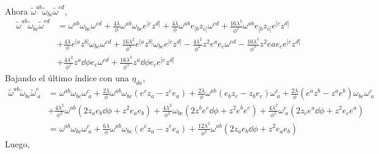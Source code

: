 Ahora $\tilde{\omega}^{ab}\tilde{\omega}_{bc}\tilde{\omega}^{cd}$,
\begin{align}
  \tilde{\omega}^{ab}\tilde{\omega}_{bc}\tilde{\omega}^{cd}&=\omega^{ab}\omega_{bc}\omega^{cd}+\frac{4\lambda}{\phi}\omega^{ab}\omega_{bc}e^{[c}z^{d]}+\frac{4\lambda}{\phi}\omega^{ab}e_{[b}z_{c]}\omega^{cd}+\frac{16\lambda^2}{\phi^2}\omega^{ab}e_{[b}z_{c]}e^{[c}z^{d]}\\&+\frac{4\lambda}{\phi}e^{[a}z^{b]}\omega_{bc}\omega^{cd}+\frac{16\lambda^2}{\phi^2}e^{[a}z^{b]}\omega_{bc}e^{[c}z^{d]}-\frac{4\lambda^2}{\phi^2}z^2e^{a}e_c\omega^{cd}-\frac{16\lambda^3}{\phi^3}z^2e{a}e_ce^{[c}z^{d]}\\
  &+\frac{4\lambda^2}{\phi^2}z^{a}\dd\phi e_c\omega^{cd}+\frac{16\lambda^3}{\phi^3}z^{a}\dd\phi e_ce^{[c}z^{d]}
\end{align}
Bajando el último índice con una $\eta_{da}$,
\begin{align*}
  \tilde{\omega}^{ab}\tilde{\omega}_{bc}\tilde{\omega}^{c}_{~a}&=\omega^{ab}\omega_{bc}\omega^{c}_{~a}+\frac{2\lambda}{\phi}\omega^{ab}\omega_{bc}(e^cz_a-z^ce_a)+\frac{2\lambda}{\phi}\omega^{ab}(e_bz_c-z_be_c)\omega^c_{~a}+\frac{2\lambda}{\phi}(e^{a}z^b-z^{a}e^b)\omega_{bc}\omega^c_{~a}\\
  &+\frac{4\lambda^2}{\phi^2}\omega^{ab}(2z_ae_b\dd\phi+z^2e_ae_b)+\frac{4\lambda^2}{\phi^2}\omega_{bc}(2z^be^c\dd\phi+z^2e^be^c)+\frac{4\lambda^2}{\phi^2}\omega^c_{~a}(2z_ce^{a}\dd\phi+z^2e_ce^{a})\\
  &=\omega^{ab}\omega_{bc}\omega^{c}_{~a}+\frac{6\lambda}{\phi}\omega^{ab}\omega_{bc}(e^cz_a-z^ce_a)+\frac{12\lambda^2}{\phi^2}\omega^{ab}(2z_ae_b\dd\phi+z^2e_ae_b)
\end{align*}
Luego, 
